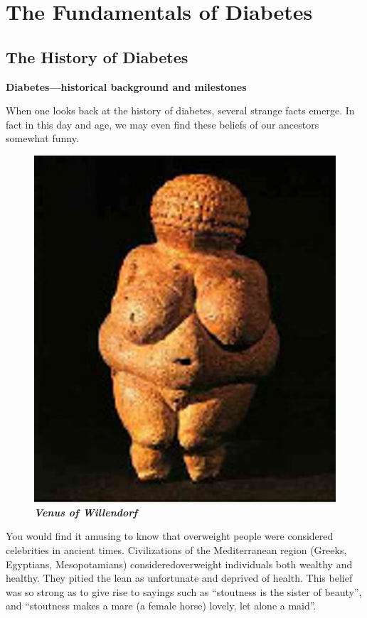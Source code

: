 
\part{The Fundamentals of Diabetes}

\chapter{The History of Diabetes}\label{chap1}

\textbf{Diabetes—historical background and milestones}

When one looks back at the history of diabetes, several strange facts emerge. In fact in this day and age, we may even find these beliefs of our ancestors somewhat funny.

\begin{figure}
\centering
\includegraphics[scale=.8]{images/004.jpg}\\
\textbf{\textit{Venus of Willendorf}}
\end{figure}

You would find it amusing to know that overweight people were considered celebrities in ancient times. Civilizations of the Mediterranean region (Greeks, Egyptians, Mesopotamians) considered\break overweight individuals both wealthy and healthy. They pitied the lean as unfortunate and deprived of health. This belief was so strong as to give rise to sayings such as “stoutness is the sister of beauty”, and “stoutness makes a mare (a female horse) lovely, let alone a maid”.

